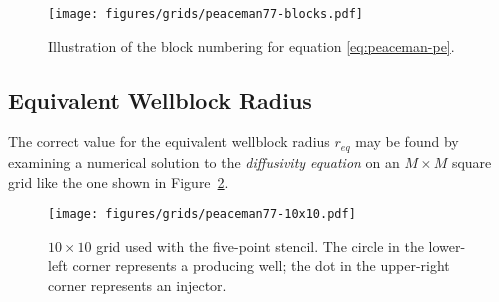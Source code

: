 \begin{figure}[htbp]
    \centering
    \texttt{[image: figures/grids/peaceman77-blocks.pdf]}
    \caption{Illustration of the block numbering for equation \eqref{eq:peaceman-pe}.}
    \label{fig:peaceman-block-numbering}
\end{figure}





\subsection{Equivalent Wellblock Radius} %
\label{sub:equivalent_wellblock_radius}
The correct value for the equivalent wellblock radius $r_{eq}$ may be found by examining a numerical solution to the \emph{ diffusivity equation} on an $M\times M$ square grid like the one shown in Figure~\ref{fig:peaceman-grid}.

\begin{figure}[htbp]
    \centering
    \texttt{[image: figures/grids/peaceman77-10x10.pdf]}
    \caption{$10\times 10$ grid used with the five-point stencil. The circle in the lower-left corner represents a producing well; the dot in the upper-right corner represents an injector.}
    \label{fig:peaceman-grid}
\end{figure}




